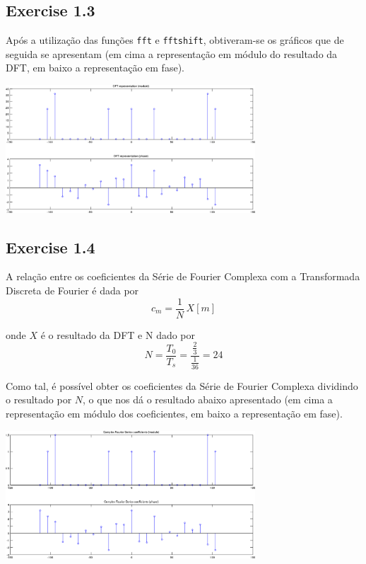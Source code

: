\documentclass[a4paper]{article}
\begin{document}
\subsection{Exercise 1.3}
\noindent Após a utilização das funções \texttt{fft} e \texttt{fftshift}, obtiveram-se os gráficos que de seguida se apresentam (em cima a representação em módulo do resultado da DFT, em baixo a representação em fase).
\begin{center}
	\includegraphics[width=0.70\textwidth]{images/ex_1_3.png}
	\label{fig:ex_1_3}
\end{center}

\subsection{Exercise 1.4}
\label{subsec:ex_1_4}
\noindent A relação entre os coeficientes da Série de Fourier Complexa com a Transformada Discreta de Fourier é dada por
\begin{equation}
	c_m = \frac{1}{N} \, X[m]
\end{equation}

\noindent onde $X$ é o resultado da DFT e N dado por
\begin{equation}
	N = \frac{T_0}{T_s} = \frac{\frac{2}{3}}{\frac{1}{36}} = 24
\end{equation}

\noindent Como tal, é possível obter os coeficientes da Série de Fourier Complexa dividindo o resultado por $N$, o que nos dá o resultado abaixo apresentado (em cima a representação em módulo dos coeficientes, em baixo a representação em fase).

\begin{center}
	\includegraphics[width=0.70\textwidth]{images/ex_1_4.png}
	\label{fig:ex_1_4}
\end{center}
\end{document}
